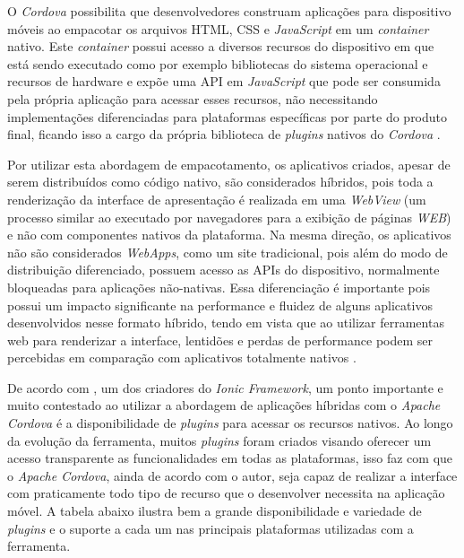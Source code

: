 O \textit{Cordova} possibilita que desenvolvedores construam aplicações para dispositivo móveis ao empacotar os arquivos HTML, CSS e \textit{JavaScript} em um \textit{container} nativo. Este \textit{container} possui acesso a diversos recursos do dispositivo em que está sendo executado como por exemplo bibliotecas do sistema operacional e recursos de hardware e expõe uma API em \textit{JavaScript} que pode ser consumida pela própria aplicação para acessar esses recursos, não necessitando implementações diferenciadas para plataformas específicas por parte do produto final, ficando isso a cargo da própria biblioteca de \textit{plugins} nativos do \textit{Cordova} \cite{Diwakar2012}.

Por utilizar esta abordagem de empacotamento, os aplicativos criados, apesar de serem distribuídos como código nativo, são considerados híbridos, pois toda a renderização da interface de apresentação é realizada em uma \textit{WebView} (um processo similar ao executado por navegadores para a exibição de páginas \textit{WEB}) e não com componentes nativos da plataforma. Na mesma direção, os aplicativos não são considerados \textit{WebApps}, como um site tradicional, pois além do modo de distribuição diferenciado, possuem acesso as APIs do dispositivo, normalmente bloqueadas para aplicações não-nativas. Essa diferenciação é importante pois possui um impacto significante na performance e fluidez de alguns aplicativos desenvolvidos nesse formato híbrido, tendo em vista que ao utilizar ferramentas web para renderizar a interface, lentidões e perdas de performance podem ser percebidas em comparação com aplicativos totalmente nativos \cite{Diwakar2012}.

De acordo com \cite{CordovaLynch2014}, um dos criadores do \textit{Ionic Framework}, um ponto importante e muito contestado ao utilizar a abordagem de aplicações híbridas com o \textit{Apache Cordova} é a disponibilidade de \textit{plugins} para acessar os recursos nativos. Ao longo da evolução da ferramenta, muitos \textit{plugins} foram criados visando oferecer um acesso transparente as funcionalidades em todas as plataformas, isso faz com que o \textit{Apache Cordova}, ainda de acordo com o autor, seja capaz de realizar a interface com praticamente todo tipo de recurso que o desenvolver necessita na aplicação móvel. A tabela abaixo ilustra bem a grande disponibilidade e variedade de \textit{plugins} e o suporte a cada um nas principais plataformas utilizadas com a ferramenta. 

